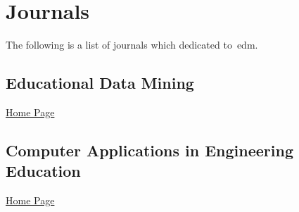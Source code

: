 \section{Journals}

The following is a list of journals which dedicated to~\gls{edm}.

\subsection{Educational Data Mining}

\href{http://www.educationaldatamining.org/proceedings}{Home Page}

\subsection{Computer Applications in Engineering Education}

\href{http://onlinelibrary.wiley.com/journal/10.1002/(ISSN)1099-0542}{Home Page}
